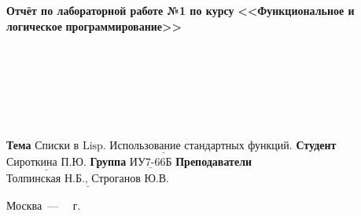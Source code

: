 \documentclass[12pt]{report}
\begin{document}
\begin{titlepage}
	
	\begin{center}
		\noindent\begin{minipage}{1.3\textwidth}\centering
			\Large\textbf{  Отчёт по лабораторной работе №1 по курсу}\newline\newline
			\textbf{<<Функциональное и логическое}\newline
			\textbf{\indent\indent\indent программирование>>}\newline
		\end{minipage}
	\end{center}
	
	~\\\\\\\\\\\\
	\large
	\noindent\textbf{Тема } $\underline{\text{Списки в Lisp. Использование стандартных функций.}}$\newline\newline
	\noindent\textbf{Студент } $\underline{\text{Сироткина П.Ю.}}$\newline\newline
	\noindent\textbf{Группа } $\underline{\text{ИУ7-66Б}}$\newline\newline
	\noindent\textbf{Преподаватели } $\underline{\text{Толпинская Н.Б., Строганов Ю.В.}}$\newline\newline\newline
	
	\begin{center}
		\vfill
		Москва~---~\the\year
		~г.
	\end{center}
\end{titlepage}

\large
%
%
\end{document}
